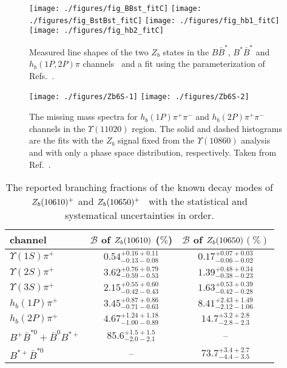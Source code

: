 \begin{figure*}[tb]
\begin{center}
 \texttt{[image: ./figures/fig\_BBst\_fitC]}\hfill
 \texttt{[image: ./figures/fig\_BstBst\_fitC]}\hfill
 \texttt{[image: ./figures/fig\_hb1\_fitC]}\hfill
 \texttt{[image: ./figures/fig\_hb2\_fitC]}\hfill
\end{center}
\caption{Measured line shapes of the two $Z_b$ states in the
$B\bar{B}^*$, $B^*\bar{B}^*$ and $h_b(1P, 2P)\pi$
channels~\cite{Garmash:2015rfd} and a fit using the parameterization of 
Refs.~\cite{Hanhart:2015cua,Guo:2016bjq}. } \label{fig:Zb5Sfull}
\end{figure*}



\begin{figure}[tb]
\begin{center}
 \texttt{[image: ./figures/Zb6S-1]}\hfill
 \texttt{[image: ./figures/Zb6S-2]}
\caption{The missing mass spectra for $h_b(1P)\pi^+\pi^-$ and 
$h_b(2P)\pi^+\pi^-$ channels  in the 
$\Upsilon(11020)$ region. The solid and dashed histograms are the fits with the
$Z_b$ signal fixed from the $\Upsilon(10860)$ analysis and with only a phase 
space distribution, respectively.
Taken from Ref.~\cite{Abdesselam:2015zza}.
} \label{fig:Zb6S}
\end{center}
\end{figure}


\begin{table}
\caption{The reported branching fractions of the known decay modes of $Z_b(10610)^+$
and $Z_b(10650)^+$~\cite{Garmash:2015rfd} with the
statistical and systematical uncertainties in order.}
\begin{ruledtabular}
\begin{tabular}{l c c}
channel & $\mathcal{B}$ of $Z_b(10610)$ ($\%$) & $\mathcal{B}$ of 
$Z_b(10650)$$(\%)$\tabularnewline
\hline
$\Upsilon(1S)\pi^{+}$ & $0.54^{+0.16+0.11}_{-0.13-0.08}$ & 
$0.17^{+0.07+0.03}_{-0.06-0.02}$\tabularnewline
$\Upsilon(2S)\pi^{+}$ & $3.62^{+0.76+0.79}_{-0.59-0.53}$ & 
$1.39^{+0.48+0.34}_{-0.38-0.23}$\tabularnewline
$\Upsilon(3S)\pi^{+}$ & $2.15^{+0.55+0.60}_{-0.42-0.43}$ & 
$1.63^{+0.53+0.39}_{-0.42-0.28}$\tabularnewline
$h_{b}(1P)\pi^{+}$ & $3.45^{+0.87+0.86}_{-0.71-0.63}$ & 
$8.41^{+2.43+1.49}_{-2.12-1.06}$\tabularnewline
$h_{b}(2P)\pi^{+}$ & $4.67^{+1.24+1.18}_{-1.00-0.89}$ & 
$14.7^{+3.2+2.8}_{-2.8-2.3}$\tabularnewline
$B^{+}\bar{B}^{*0}+\bar{B}^{0}B^{*+}$ & $85.6^{+1.5+1.5}_{-2.0-2.1}$ & 
--\tabularnewline
$B^{*+}\bar{B}^{*0}$ & -- & $73.7^{+3.4+2.7}_{-4.4-3.5}$\tabularnewline
\end{tabular}
\end{ruledtabular}
\label{tab:ZbBr}
\end{table}

